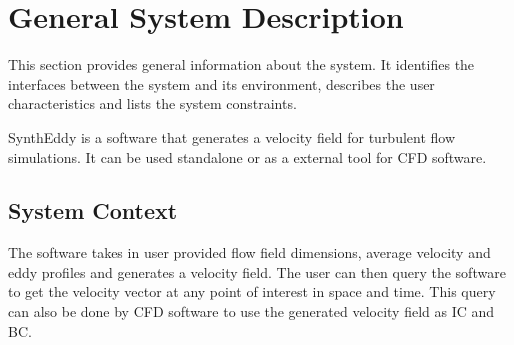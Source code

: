 \documentclass[12pt]{article}
\begin{document}

\section{General System Description} \label{Sec_GSD}

This section provides general information about the system.  It identifies the
interfaces between the system and its environment, describes the user
characteristics and lists the system constraints.  

SynthEddy is a software that generates a velocity field for turbulent flow simulations. It can be used standalone or as a external tool for CFD software.


\subsection{System Context}

The software takes in user provided flow field dimensions, average velocity and eddy profiles and generates a velocity field. The user can then query the software to get the velocity vector at any point of interest in space and time. This query can also be done by CFD software to use the generated velocity field as IC and BC.
\end{document}
